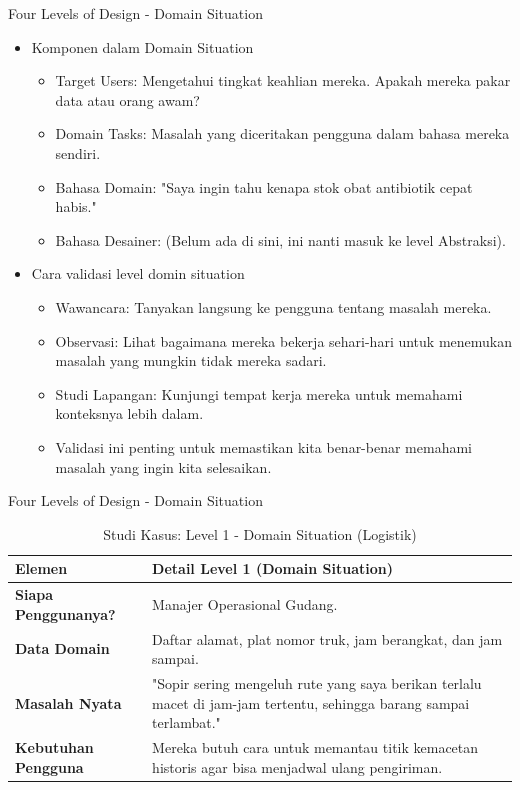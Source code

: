 \documentclass[t]{beamer}
\begin{document}
\begin{frame}{Four Levels of Design - Domain Situation}
	\begin{itemize}
\item Komponen dalam Domain Situation
		\begin{itemize}
			\item Target Users: Mengetahui tingkat keahlian mereka. Apakah mereka pakar data atau orang awam?
			\item Domain Tasks: Masalah yang diceritakan pengguna dalam bahasa mereka sendiri.
			\item Bahasa Domain: "Saya ingin tahu kenapa stok obat antibiotik cepat habis."
			\item Bahasa Desainer: (Belum ada di sini, ini nanti masuk ke level Abstraksi).
		\end{itemize}
\item Cara validasi level domin situation
		\begin{itemize}
			\item Wawancara: Tanyakan langsung ke pengguna tentang masalah mereka.
			\item Observasi: Lihat bagaimana mereka bekerja sehari-hari untuk menemukan masalah yang mungkin tidak mereka sadari.
			\item Studi Lapangan: Kunjungi tempat kerja mereka untuk memahami konteksnya lebih dalam.
			\item Validasi ini penting untuk memastikan kita benar-benar memahami masalah yang ingin kita selesaikan.
		\end{itemize}
	\end{itemize}
\end{frame}
		

\begin{frame}{Four Levels of Design - Domain Situation}
	\begin{table}[h]
    \centering
    \small
    \caption{Studi Kasus: Level 1 - Domain Situation (Logistik)}
    \vspace{0.3cm}
    \begin{tabularx}{\textwidth}{@{} l >{\RaggedRight\arraybackslash}X @{}}
        \toprule
        \textbf{Elemen} & \textbf{Detail Level 1 (Domain Situation)} \\ 
        \midrule
        \textbf{Siapa Penggunanya?} & Manajer Operasional Gudang. \\ \addlinespace
        \textbf{Data Domain} & Daftar alamat, plat nomor truk, jam berangkat, dan jam sampai. \\ \addlinespace
        \textbf{Masalah Nyata} & "Sopir sering mengeluh rute yang saya berikan terlalu macet di jam-jam tertentu, sehingga barang sampai terlambat." \\ \addlinespace
        \textbf{Kebutuhan Pengguna} & Mereka butuh cara untuk memantau titik kemacetan historis agar bisa menjadwal ulang pengiriman. \\ 
        \bottomrule
    \end{tabularx}
	\end{table}

\end{frame}
\end{document}
